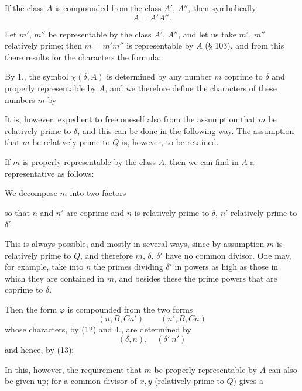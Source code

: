 
If the class $A$ is compounded from the class $A'$, $A''$, then
symbolically
\[
A = A'A''.
\]

Let $m'$, $m''$ be representable by the class $A'$, $A''$, and let us
take $m'$, $m''$ relatively prime; then $m = m'm''$ is representable by $A$
(§ 103), and from this there results for the characters the formula:


By 1., the symbol $\chi(\delta, A)$ is determined by any number $m$
coprime to $\delta$ and properly representable by $A$,
and we therefore define the characters of these numbers $m$ by


It is, however, expedient to free oneself also from the assumption that $m$ be relatively prime to $\delta$, and this
can be done in the following way. The assumption that
$m$ be relatively prime to $Q$ is, however, to be retained.

If $m$ is properly representable by the class $A$, then we
can find in $A$ a representative as follows:


We decompose $m$ into two factors


so that $n$ and $n'$ are coprime and $n$ is relatively prime to $\delta$, $n'$
relatively prime to $\delta'$.

This is always possible, and mostly in several ways, since by
assumption $m$ is relatively prime to $Q$, and therefore $m$, $\delta$, $\delta'$ have no
common divisor. One may, for example, take into $n$ the primes
dividing $\delta'$ in powers as high as those in
which they are contained in $m$, and besides these the prime powers
that are coprime to $\delta$.

Then the form $\varphi$ is compounded from the two forms
\[
(n, B, Cn') \qquad (n', B, Cn)
\]
whose characters, by (12) and 4., are determined by
\[
(\delta, n), \quad (\delta'\ n') %
\]
and hence, by (13):


In this, however, the requirement that $m$ be properly
representable by $A$ can also be given up; for a
common divisor of $x, y$ (relatively prime to $Q$) gives a
